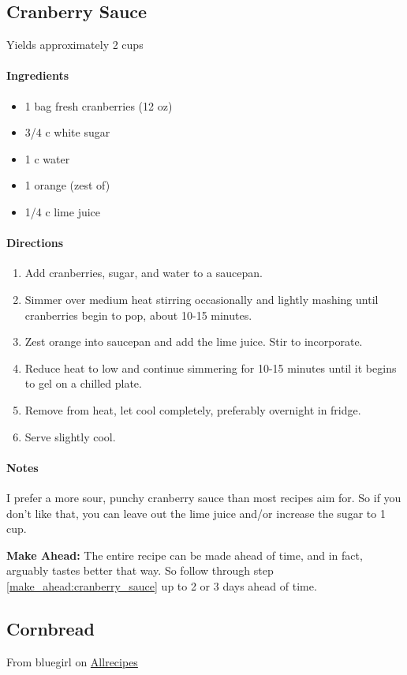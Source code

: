 \documentclass[12pt]{article}
\newenvironment*{ingredients}
	{
		\paragraph*{Ingredients}
		\begin{itemize}
	}
	{
		\end{itemize}
	}
\newenvironment*{directions}
	{
		\paragraph*{Directions}
		\begin{enumerate}
	}
	{
		\end{enumerate}
	}
\newenvironment*{notes}
	{
		\paragraph*{Notes}
		\begin{adjustwidth}{1cm}{}
	}
	{
		\end{adjustwidth}
	}
\begin{document}
	\newpage
	
	\subsection{Cranberry Sauce}\label{sec:cranberry_sauce}
	Yields approximately 2 cups
	
	\begin{ingredients}
		\item 1 bag fresh cranberries (12 oz)
		\item 3/4 c white sugar
		\item 1 c water
		\item 1 orange (zest of)
		\item 1/4 c lime juice
	\end{ingredients}
	
	\begin{directions}
		\item Add cranberries, sugar, and water to a saucepan.
		\item Simmer over medium heat stirring occasionally and lightly mashing until cranberries begin to pop, about 10-15 minutes.
		\item Zest orange into saucepan and add the lime juice. Stir to incorporate.
		\item Reduce heat to low and continue simmering for 10-15 minutes until it begins to gel on a chilled plate.
		\item Remove from heat, let cool completely, preferably overnight in fridge. \label{make_ahead:cranberry_sauce}
		\item Serve slightly cool.
	\end{directions}
	
	\begin{notes}
		I prefer a more sour, punchy cranberry sauce than most recipes aim for. So if you don't like that, you can leave out the lime juice and/or increase the sugar to 1 cup.
		
		\textbf{Make Ahead:} The entire recipe can be made ahead of time, and in fact, arguably tastes better that way. So follow through step \ref{make_ahead:cranberry_sauce} up to 2 or 3 days ahead of time.
	\end{notes}
	
	\newpage
	
	\subsection{Cornbread}\label{sec:cornbread}
	From bluegirl on \href{https://www.allrecipes.com/recipe/17891/golden-sweet-cornbread/}{Allrecipes}
	
\end{document}
